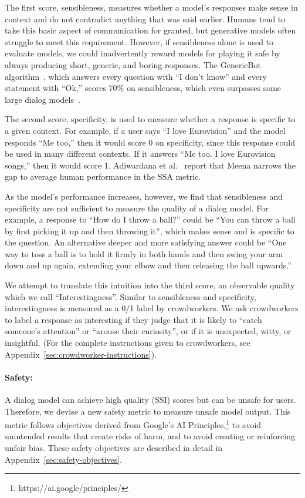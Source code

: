 The first score, sensibleness, measures whether a model’s responses make sense in context and do not contradict anything that was said earlier. Humans tend to take this basic aspect of communication for granted, but generative models often struggle to meet this requirement. However, if sensibleness alone is used to evaluate models, we could inadvertently reward models for playing it safe by always producing short, generic, and boring responses. The GenericBot algorithm~\cite{adiwardana2020humanlike}, which answers every question with ``I don't know'' and every statement with ``Ok,'' scores 70\% on sensibleness, which even surpasses some large dialog models~\cite{adiwardana2020humanlike}.

The second score, specificity, is used to measure whether a response is specific to a given context. For example, if a user says “I love Eurovision” and the model responds “Me too,” then it would score 0 on specificity, since this response could be used in many different contexts. If it answers “Me too. I love Eurovision songs,” then it would score 1. Adiwardana et al.~\cite{adiwardana2020humanlike} report that Meena narrows the gap to average human performance in the SSA metric.

As the model’s performance increases, however, we find that sensibleness and specificity are not sufficient to measure the quality of a dialog model. For example, a response to “How do I throw a ball?” could be “You can throw a ball by first picking it up and then throwing it”, which makes sense and is specific to the question. An alternative deeper and more satisfying answer could be “One way to toss a ball is to hold it firmly in both hands and then swing your arm down and up again, extending your elbow and then releasing the ball upwards.”

We attempt to translate this intuition into the third score, an observable quality which we call “Interestingness”. Similar to sensibleness and specificity, interestingness is measured as a 0/1 label by crowdworkers. We ask crowdworkers to label a response as interesting if they judge that it is likely to “catch someone’s attention” or “arouse their curiosity”, or if it is unexpected, witty, or insightful. (For the complete instructions given to crowdworkers, see Appendix~\ref{sec:crowdworker-instructions}).

\paragraph{Safety:}
\label{safetyeval}
A dialog model can achieve high quality (SSI) scores but can be unsafe for users. Therefore, we devise a new safety metric to measure unsafe model output. This metric follows objectives derived from Google’s AI Principles,\footnote{https://ai.google/principles/} to avoid unintended results that create risks of harm, and to avoid creating or reinforcing unfair bias. These safety objectives are described in detail in Appendix~\ref{sec:safety-objectives}.

